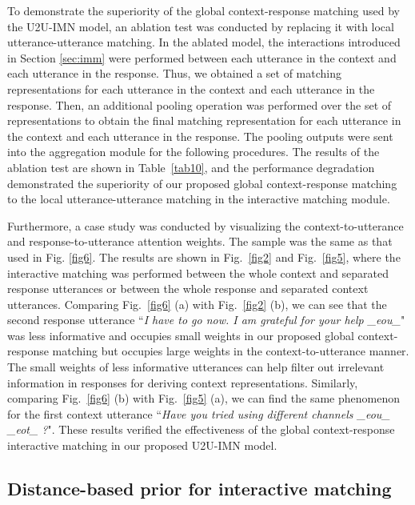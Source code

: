 \documentclass[journal]{IEEEtran}
\begin{document}
    To demonstrate the superiority of the global context-response matching used by the U2U-IMN model, an ablation test was conducted by  replacing it with local utterance-utterance matching.
    In the ablated model, the interactions introduced in Section \ref{sec:imm} were performed between each utterance in the context and each utterance in the response.
    Thus, we obtained a set of matching representations for each utterance in the context and each utterance in the response.
    Then, an additional pooling operation was performed over the set of representations to obtain the final matching representation for each utterance in the context and each utterance in the response.
    The pooling outputs were sent into the aggregation module for the following procedures.
    The results of the ablation test are shown in Table~\ref{tab10}, and the performance degradation demonstrated the superiority of our proposed global context-response matching to the local utterance-utterance matching in the interactive matching module.

    Furthermore, a case study was conducted by visualizing the context-to-utterance and response-to-utterance attention weights.
    The sample was the same as that used in Fig. \ref{fig6}.
    The results are shown in Fig.~\ref{fig2} and Fig.~\ref{fig5}, where the interactive matching was performed between the whole context and separated response utterances or between the whole response and separated context utterances.
    Comparing Fig.~\ref{fig6} (a) with Fig.~\ref{fig2} (b), we can see that the second response utterance  ``\emph{I have to go now. I am grateful for your help \_eou\_}" was less informative and occupies small weights in our proposed global context-response matching but occupies large weights in the context-to-utterance manner.
    The small weights of less informative utterances can help filter out irrelevant information in responses for deriving context representations.
    Similarly, comparing Fig.~\ref{fig6} (b) with Fig.~\ref{fig5} (a), we can find the same phenomenon for the first context utterance ``\emph{Have you tried using different channels \_eou\_ \_eot\_ ?}".
    These results verified the effectiveness of the global context-response interactive matching in our proposed U2U-IMN model.


  \subsection{Distance-based prior for interactive matching}
\end{document}

